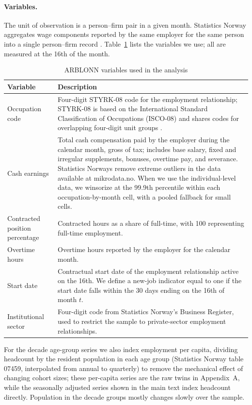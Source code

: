 \documentclass[12pt]{article}
\begin{document}
\paragraph{Variables.}
The unit of observation is a person--firm pair in a given month. Statistics Norway aggregates wage components reported by the same employer for the same person into a single person--firm record \citep{ssb_klassifisering}. Table~\ref{tab:arblonn_variables} lists the variables we use; all are measured at the 16th of the month.

\begin{table}[htbp]
\centering
\caption{ARBLONN variables used in the analysis}
\label{tab:arblonn_variables}
\footnotesize
\begin{tabular}{p{4.2cm}p{10cm}}
\toprule
Variable & Description \\
\midrule
Occupation code & Four-digit STYRK-08 code for the employment relationship; STYRK-08 is based on the International Standard Classification of Occupations (ISCO-08) and shares codes for overlapping four-digit unit groups \citep{ssb2011styrk}. \\[4pt]
Cash earnings & Total cash compensation paid by the employer during the calendar month, gross of tax; includes base salary, fixed and irregular supplements, bonuses, overtime pay, and severance. Statistics Norways remove extreme outliers in the data available at mikrodata.no. When we use the individual-level data, we winsorize at the 99.9th percentile within each occupation-by-month cell, with a pooled fallback for small cells. \\[4pt]
Contracted position percentage & Contracted hours as a share of full-time, with 100 representing full-time employment. \\[4pt]
Overtime hours & Overtime hours reported by the employer for the calendar month. \\[4pt]
Start date & Contractual start date of the employment relationship active on the 16th. We define a new-job indicator equal to one if the start date falls within the 30 days ending on the 16th of month $t$. \\[4pt]
Institutional sector & Four-digit code from Statistics Norway's Business Register, used to restrict the sample to private-sector employment relationships. \\
\bottomrule
\end{tabular}
\end{table}

For the decade age-group series we also index employment per capita, dividing headcount by the resident population in each age group (Statistics Norway table 07459, interpolated from annual to quarterly) to remove the mechanical effect of changing cohort sizes; these per-capita series are the raw twins in Appendix~A, while the seasonally adjusted series shown in the main text index headcount directly. Population in the decade groups mostly changes slowly over the sample.
\end{document}
